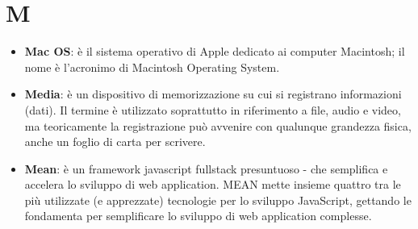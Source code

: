 \section{M}
\begin{itemize} 
	\item
	\textbf{Mac OS}: è il sistema operativo di Apple dedicato ai computer Macintosh; il nome è l'acronimo di Macintosh Operating System.
	\item
	\textbf{Media}: è un dispositivo di memorizzazione su cui si registrano informazioni (dati). Il termine è utilizzato soprattutto in riferimento a file, audio e video, ma teoricamente la registrazione può avvenire con qualunque grandezza fisica, anche un foglio di carta per scrivere.
	\item
	\textbf{Mean}: è un framework javascript fullstack presuntuoso - che semplifica e accelera lo sviluppo di web application. MEAN mette insieme quattro tra le più utilizzate (e apprezzate) tecnologie per lo sviluppo JavaScript, gettando le fondamenta per semplificare lo sviluppo di web application complesse.
	

\end{itemize}
